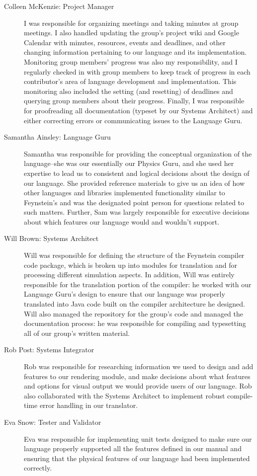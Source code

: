 \begin{description}
\item[Colleen McKenzie: Project Manager] I was responsible for
  organizing meetings and taking minutes at group meetings. I also
  handled updating the group's project wiki and Google Calendar with
  minutes, resources, events and deadlines, and other changing 
  information pertaining to our language and its
  implementation. Monitoring group members' progress was also my
  responsibility, and I regularly checked in with group members to
  keep track of progress in each contributor's area of language
  development and implementation. This monitoring also included the
  setting (and resetting) of deadlines and querying group members
  about their progress. Finally, I was responsible for proofreading
  all documentation (typeset by our Systems Architect) and either 
  correcting errors or communicating issues to the Language Guru.

\item[Samantha Ainsley: Language Guru] Samantha was responsible for
  providing the conceptual organization of the language--she was our
  essentially our Physics Guru, and she used her expertise to lead us
  to consistent and logical decisions about the design of our
  language. She provided reference materials to give us an idea of how
  other languages and libraries implemented functionality similar to
  Feynstein's and was the designated point person for questions
  related to such matters. Further, Sam was largely responsible for
  executive decisions about which features our language would and
  wouldn't support.

\item[Will Brown: Systems Architect] Will was responsible for defining
  the structure of the Feynstein compiler code package, which is
  broken up into modules for translation and for processing different
  simulation aspects. In addition, Will was entirely responsible for
  the translation portion of the compiler: he worked with our Language
  Guru's design to ensure that our language was properly translated
  into Java code built on the compiler architecture he designed. Will
  also managed the repository for the group's code and managed the
  documentation process: he was responsible for compiling and
  typesetting all of our group's written material.

\item[Rob Post: Systems Integrator] Rob was responsible for
  researching information we used to design and add features to our
  rendering module, and make decisions about what features and options
  for visual output we would provide users of our language. Rob also
  collaborated with the Systems Architect to implement robust
  compile-time error handling in our translator.

\item[Eva Snow: Tester and Validator] Eva was responsible for
  implementing unit tests designed to make sure our language properly
  supported all the features defined in our manual and ensuring that
  the physical features of our language had been implemented
  correctly.
\end{description}

